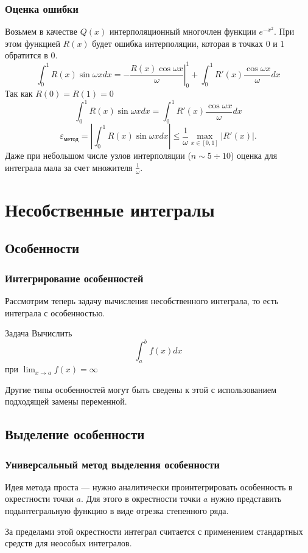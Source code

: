 \documentclass[aspectratio=169,unicode]{beamer}
\begin{document}
\begin{frame}
\frametitle{Оценка ошибки}
	Возьмем в качестве $Q(x)$ интерполяционный многочлен функции $e^{-x^2}$. При этом функцией $R(x)$
	будет ошибка интерполяции, которая в точках $0$ и $1$ обратится в $0$.
	\[
	\int_0^1 R(x) \sin \omega x dx = - \left.\frac{R(x) \cos \omega x}{\omega} \right|_0^1 +
	\int_0^1 R'(x) \frac{\cos \omega x}{\omega} dx
	\]
	Так как $R(0)=R(1)=0$
	\[
	\int_0^1 R(x) \sin \omega x dx = \int_0^1 R'(x) \frac{\cos \omega x}{\omega} dx
	\]
	\[
	\varepsilon_{\text{метод}} = \left| \int_0^1 R(x) \sin \omega x dx \right| \leq \frac{1}{\omega} \max_{x\in[0,1]} |R'(x)|.
	\]
	Даже при небольшом числе узлов интерполяции ($n \sim 5 \div 10$) оценка для интеграла мала за счет множителя $\frac{1}{\omega}$.
\end{frame}

\section{Несобственные интегралы}
\subsection{Особенности}
\begin{frame}
\frametitle{Интегрирование особенностей}
	Рассмотрим теперь задачу вычисления несобственного интеграла, то есть интеграла с особенностью.
	\pause
	\begin{block}{Задача}
		Вычислить
		\[
		\int_a^b f(x) dx
		\]
		при $\lim_{x \rightarrow a}f(x) = \infty$
	\end{block}
	\pause

	Другие типы особенностей могут быть сведены к этой с использованием подходящей замены переменной.
\end{frame}

\subsection{Выделение особенности}
\begin{frame}
\frametitle{Универсальный метод выделения особенности}
	Идея метода %
	проста --- нужно аналитически проинтегрировать особенность
	в окрестности точки $a$. Для этого в окрестности точки $a$ нужно представить
	подынтегральную функцию в виде отрезка степенного ряда.

	За пределами этой окрестности интеграл считается с применением стандартных средств для
	неособых интегралов.
\end{frame}
\end{document}
